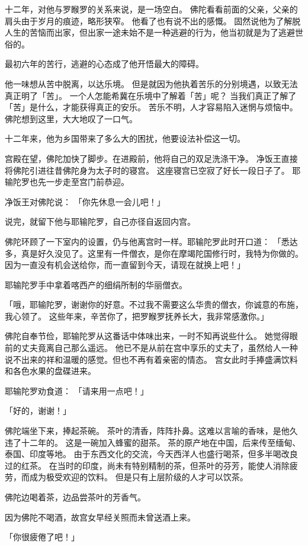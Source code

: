 \documentclass[twoside,openany]{book}
\begin{document}
十二年，对他与罗睺罗的关系来说，是一场空白。
佛陀看看前面的父亲，父亲的肩头由于岁月的痕迹，略形狭窄。
他看了也有说不出的感慨。
固然说他为了解脱人生的苦恼而出家，但出家一途未始不是一种逃避的行为，他当初就是为了逃避世俗的。

最初六年的苦行，逃避的心态成了他开悟最大的障碍。

他一味想从苦中脱离，以达乐境。
但是就因为他执着苦乐的分别境遇，以致无法真正明了「苦」。
一个人怎能希冀在乐境中了解着「苦」呢？
当我们真正了解了「苦」是什么，才能获得真正的安乐。
苦乐不明，人才容易陷入迷惘与烦恼中。
佛陀想到这里，大大地叹了一口气。

十二年来，他为乡国带来了多么大的困扰，他要设法补偿这一切。

宫殿在望，佛陀加快了脚步。在进殿前，他将自己的双足洗涤干净。
净饭王直接将佛陀引进往昔佛陀身为太子时的寝宫。
这座寝宫已空寂了好长一段日子了。
耶输陀罗也先一步走至宫门前恭迎。

净饭王对佛陀说：
「你先休息一会儿吧！」

说完，就留下他与耶输陀罗，自己亦径自返回内宫。

佛陀环顾了一下室内的设置，仍与他离宫时一样。耶输陀罗此时开口道：
「悉达多，真是好久没见了。这里有一件僧衣，是你在摩竭陀国修行时，我特为你做的。
因为一直没有机会送给你，而一直留到今天，请现在就换上吧！」

耶输陀罗手中拿着喀西产的细绢所制的华丽僧衣。

「哦，耶输陀罗，谢谢你的好意。不过我不需要这么华贵的僧衣，你诚意的布施，我心领了。
这些年来，辛苦你了，把罗睺罗抚养长大，我非常感激你。」

佛陀自奉节俭，耶输陀罗从这番话中体味出来，一时不知再说些什么。
她觉得眼前的丈夫竟离自己那么遥远。
他已不是从前在宫中享乐的丈夫了，虽然给人一种说不出来的祥和温暖的感觉。但也不再有着亲密的情态。
宫女此时手捧盛满饮料和各色水果的盘碟进来。

耶输陀罗劝食道：
「请来用一点吧！」

「好的，谢谢！」

佛陀端坐下来，捧起茶碗。
茶叶的清香，阵阵扑鼻。这难以言喻的香味，是他久违了十二年的。
这是一碗加入蜂蜜的甜茶。
茶的原产地在中国，后来传至缅甸、泰国、印度等地。
由于东西文化的交流，今天西洋人也盛行喝茶，但多半喝改良过的红茶。
在当时的印度，尚未有特别精制的茶，但茶叶的芬芳，能使人消除疲劳，而成为极受欢迎的饮料。
但是只有上层阶级的人才可以饮茶。

佛陀边喝着茶，边品尝茶叶的芳香气。

因为佛陀不喝酒，故宫女早经关照而未曾送酒上来。

「你很疲倦了吧！」
\end{document}
